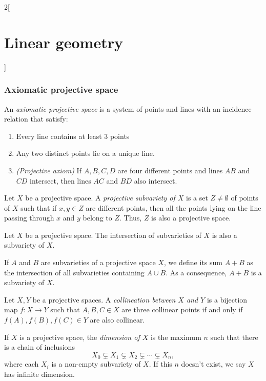 \documentclass[../../../main.tex]{subfiles}
\begin{document}
\begin{multicols}{2}[\section{Linear geometry}]
\subsubsection*{Axiomatic projective space}
\begin{definition}
An \textit{axiomatic projective space} is a system of points and lines with an incidence relation that satisfy:
\begin{enumerate}
    \item Every line contains at least 3 points
    \item Any two distinct points lie on a unique line.
    \item \textit{(Projective axiom)} If $A,B,C,D$ are four different points and lines $AB$ and $CD$ intersect, then lines $AC$ and $BD$ also intersect.
\end{enumerate}
\end{definition}
\begin{definition}
Let $X$ be a projective space. A \textit{projective subvariety of $X$} is a set $Z\ne\emptyset$ of points of $X$ such that if $x,y\in Z$ are different points, then all the points lying on the line passing through $x$ and $y$ belong to $Z$. Thus, $Z$ is also a projective space.
\end{definition}
\begin{prop}
Let $X$ be a projective space. The intersection of subvarieties of $X$ is also a subvariety of $X$.
\end{prop}
\begin{prop}
If $A$ and $B$ are subvarieties of a projective space $X$, we define its sum $A+B$ as the intersection of all subvarieties containing $A\cup B$. As a consequence, $A+B$ is a subvariety of $X$.
\end{prop}
\begin{definition}
Let $X,Y$ be a projective spaces. A \textit{collineation between $X$ and $Y$} is a bijection map $f:X\rightarrow Y$ such that $A,B,C\in X$ are three collinear points if and only if $f(A),f(B),f(C)\in Y$ are also collinear.
\end{definition}
\begin{definition}
If $X$ is a projective space, the \textit{dimension of $X$} is the maximum $n$ such that there is a chain of inclusions $$X_0\varsubsetneq X_1\varsubsetneq X_2 \varsubsetneq\cdots\varsubsetneq X_n,$$ where each $X_i$ is a non-empty subvariety of $X$. If this $n$ doesn't exist, we say $X$ has infinite dimension.
\end{definition}
\begin{definition}

\end{definition}
\end{multicols}
\end{document}
